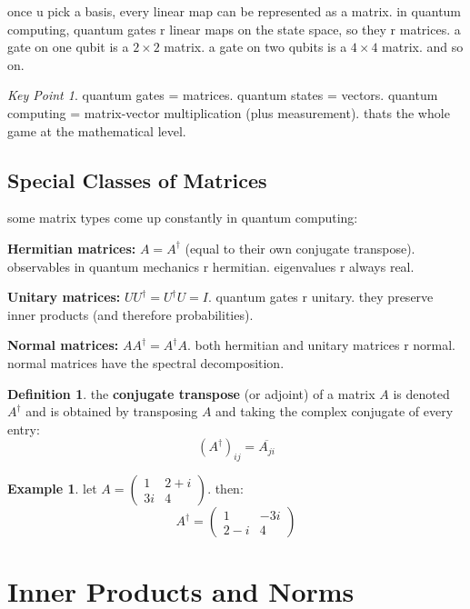 \documentclass[11pt,a4paper]{article}
\theoremstyle{definition}
\newtheorem{definition}{Definition}[section]
\newtheorem{example}{Example}[section]
\theoremstyle{remark}
\newtheorem*{keypoint}{Key Point}
\begin{document}
once u pick a basis, every linear map can be represented as a matrix. in quantum computing, quantum gates r linear maps on the state space, so they r matrices. a gate on one qubit is a $2 \times 2$ matrix. a gate on two qubits is a $4 \times 4$ matrix. and so on.

\begin{keypoint}
quantum gates = matrices. quantum states = vectors. quantum computing = matrix-vector multiplication (plus measurement). thats the whole game at the mathematical level.
\end{keypoint}

\subsection{Special Classes of Matrices}

some matrix types come up constantly in quantum computing:

\textbf{Hermitian matrices:} $A = A^\dagger$ (equal to their own conjugate transpose). observables in quantum mechanics r hermitian. eigenvalues r always real.

\textbf{Unitary matrices:} $U U^\dagger = U^\dagger U = I$. quantum gates r unitary. they preserve inner products (and therefore probabilities).

\textbf{Normal matrices:} $A A^\dagger = A^\dagger A$. both hermitian and unitary matrices r normal. normal matrices have the spectral decomposition.

\begin{definition}
the \textbf{conjugate transpose} (or adjoint) of a matrix $A$ is denoted $A^\dagger$ and is obtained by transposing $A$ and taking the complex conjugate of every entry:
\[
(A^\dagger)_{ij} = \overline{A_{ji}}
\]
\end{definition}

\begin{example}
let $A = \begin{pmatrix} 1 & 2+i \\ 3i & 4 \end{pmatrix}$. then:
\[
A^\dagger = \begin{pmatrix} 1 & -3i \\ 2-i & 4 \end{pmatrix}
\]
\end{example}

\section{Inner Products and Norms}
\end{document}
